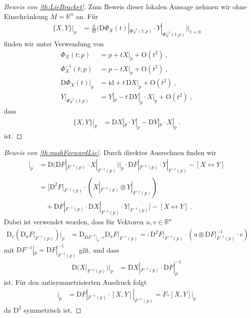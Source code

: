 \documentclass[10pt,a4paper]{article}
\theoremstyle{mytheorem}
\theoremstyle{mydefinition}
\newcommand{\dt}{\mathrm{d}}
\newcommand{\Dt}{\mathrm{D}}
\begin{document}
\begin{proof}[Beweis von \ref{th:LieBracket}]
Zum Beweis dieser lokalen Aussage nehmen wir ohne Einschränkung $M=\mathbb{R}^n$ an.
Für
\begin{align*}
	\{X, Y\}\big|_{p}
	&=
	\frac{\dt}{\dt t}
	\Big(
		\Dt\Phi_X(t)|_{\Phi_X^{-1}(t; p)}
		\cdot
		Y|_{\Phi_X^{-1}(t; p)}
	\Big)\Big|_{t=0}
\end{align*}
finden wir unter Verwendung von
\begin{align*}
	\Phi_X(t; p)
	&= p + t X|_{p} + \mathrm{O}(t^2)
	\ ,\nonumber\\
	\Phi_X^{-1}(t; p)
	&= p - t X|_{p} + \mathrm{O}(t^2)
	\ ,\nonumber\\
	\Dt\Phi_X(t)\big|_{p}
	&= \mathrm{id} + t\,\Dt X|_{p} + \mathrm{O}(t^2)
	\ ,\nonumber\\
	Y|_{\Phi_X^{-1}(t; p)}
	&= Y|_{p} - t\,\Dt Y|_{p}\cdot X|_{p} + \mathrm{O}(t^2)
	\ ,
\end{align*}
dass
\begin{align*}
	\{X, Y\}\big|_{p}
	&=
	\Dt X|_{p}
	\cdot
	Y|_{p}
	-
	\Dt Y|_{p}
	\cdot
	X|_{p}
	\ .
\end{align*}
ist.
\end{proof}

\begin{proof}[Beweis von \ref{th:pushForwardLie}]
Durch direktes Ausrechnen finden wir
\begin{align*}
	[F_*X, F_*Y]\big|_{p}
	&= 
	\Dt \big(
		\Dt F|_{F^{-1}(p)} \cdot X|_{F^{-1}(p)}
	\big)\big|_p
	\cdot
	\Dt F|_{F^{-1}(p)} \cdot Y|_{F^{-1}(p)}
	- [X\leftrightarrow Y]
	\nonumber\\
	&=
	\big[
		\Dt^2F|_{F^{-1}(p)}
		\cdot
		(X|_{F^{-1}(p)}\otimes Y|_{F^{-1}(p)})
		\nonumber\\
		&\quad 
		+
		\Dt F|_{F^{-1}(p)} 
		\cdot \Dt X|_{F^{-1}(p)}
		\cdot Y|_{F^{-1}(p)}
	\big]
	- [X\leftrightarrow Y]
	\ .
\end{align*}
Dabei ist verwendet worden, dass für Vektoren $u,v\in\mathbb{R}^n$
\begin{align*}
	\Dt_v(\Dt_u F|_{F^{-1}(p)})\big|_p
	&=
	\Dt_{\Dt F^{-1}|_p\cdot v}
	\Dt_u F\big|_{F^{-1}(p)}
	=:
	\Dt^2F|_{F^{-1}(p)}\cdot(u \otimes \Dt F|_{F^{-1}(p)}^{-1}\cdot v)
\end{align*}
mit $\Dt F^{-1}|_p=\Dt F|_{F^{-1}(p)}^{-1}$ gilt, und dass
\begin{align*}
	\Dt \big(
		X|_{F^{-1}(p)}
	\big)\big|_p
	&=
	\Dt X|_{F^{-1}(p)}
	\cdot \Dt F|_{p}^{-1}
\end{align*}
ist.
Für den antisymmetrisierten Ausdruck folgt
\begin{align*}
	[F_*X, F_*Y]\big|_{p}
	&= \Dt F|_{F^{-1}(p)}
	\cdot
	[X, Y]|_{F^{-1}(p)}
	= F_*[X, Y]|_p
\end{align*}
da $\Dt^2$ symmetrisch ist.
\end{proof}
\end{document}
